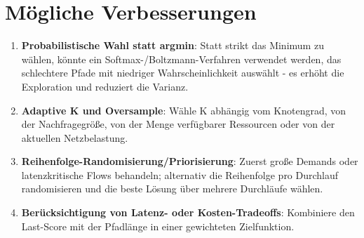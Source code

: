 \section{Mögliche Verbesserungen}
\begin{enumerate}
    \item \textbf{Probabilistische Wahl statt argmin}: Statt strikt das Minimum zu wählen, könnte ein Softmax-/Boltzmann-Verfahren verwendet werden, das schlechtere Pfade mit niedriger Wahrscheinlichkeit auswählt - es erhöht die Exploration und reduziert die Varianz.
    \item \textbf{Adaptive K und Oversample}: Wähle K abhängig vom Knotengrad, von der Nachfragegröße, von der Menge verfügbarer Ressourcen oder von der aktuellen Netzbelastung.
    \item \textbf{Reihenfolge-Randomisierung/Priorisierung}: Zuerst große Demands oder latenzkritische Flows behandeln; alternativ die Reihenfolge pro Durchlauf randomisieren und die beste Lösung über mehrere Durchläufe wählen.
    \item \textbf{Berücksichtigung von Latenz- oder Kosten-Tradeoffs}: Kombiniere den Last-Score mit der Pfadlänge in einer gewichteten Zielfunktion.
\end{enumerate}